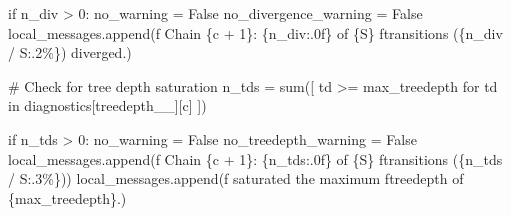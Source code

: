 \documentclass[
  letterpaper,
  DIV=11,
  numbers=noendperiod]{scrartcl}
\newenvironment{Shaded}{\begin{snugshade}}{\end{snugshade}}
\newcommand{\BuiltInTok}[1]{\textcolor[rgb]{0.00,0.23,0.31}{#1}}
\newcommand{\CommentTok}[1]{\textcolor[rgb]{0.37,0.37,0.37}{#1}}
\newcommand{\ControlFlowTok}[1]{\textcolor[rgb]{0.00,0.23,0.31}{#1}}
\newcommand{\DecValTok}[1]{\textcolor[rgb]{0.68,0.00,0.00}{#1}}
\newcommand{\KeywordTok}[1]{\textcolor[rgb]{0.00,0.23,0.31}{#1}}
\newcommand{\NormalTok}[1]{\textcolor[rgb]{0.00,0.23,0.31}{#1}}
\newcommand{\OperatorTok}[1]{\textcolor[rgb]{0.37,0.37,0.37}{#1}}
\newcommand{\SpecialCharTok}[1]{\textcolor[rgb]{0.37,0.37,0.37}{#1}}
\newcommand{\SpecialStringTok}[1]{\textcolor[rgb]{0.13,0.47,0.30}{#1}}
\newcommand{\StringTok}[1]{\textcolor[rgb]{0.13,0.47,0.30}{#1}}
\newcommand{\VariableTok}[1]{\textcolor[rgb]{0.07,0.07,0.07}{#1}}
\begin{document}
\begin{Shaded}
\begin{Highlighting}[]
    \ControlFlowTok{if}\NormalTok{ n\_div }\OperatorTok{\textgreater{}} \DecValTok{0}\NormalTok{:}
\NormalTok{      no\_warning }\OperatorTok{=} \VariableTok{False}
\NormalTok{      no\_divergence\_warning }\OperatorTok{=} \VariableTok{False}
\NormalTok{      local\_messages.append(}\SpecialStringTok{f\textquotesingle{}  Chain }\SpecialCharTok{\{}\NormalTok{c }\OperatorTok{+} \DecValTok{1}\SpecialCharTok{\}}\SpecialStringTok{: }\SpecialCharTok{\{}\NormalTok{n\_div}\SpecialCharTok{:.0f\}}\SpecialStringTok{ of }\SpecialCharTok{\{}\NormalTok{S}\SpecialCharTok{\}}\SpecialStringTok{ \textquotesingle{}}
                            \SpecialStringTok{f\textquotesingle{}transitions (}\SpecialCharTok{\{}\NormalTok{n\_div }\OperatorTok{/}\NormalTok{ S}\SpecialCharTok{:.2\%\}}\SpecialStringTok{) diverged.\textquotesingle{}}\NormalTok{)}
    
    \CommentTok{\# Check for tree depth saturation}
\NormalTok{    n\_tds }\OperatorTok{=} \BuiltInTok{sum}\NormalTok{([ td }\OperatorTok{\textgreater{}=}\NormalTok{ max\_treedepth }
                  \ControlFlowTok{for}\NormalTok{ td }\KeywordTok{in}\NormalTok{ diagnostics[}\StringTok{\textquotesingle{}treedepth\_\_\textquotesingle{}}\NormalTok{][c] ])}
    
    \ControlFlowTok{if}\NormalTok{ n\_tds }\OperatorTok{\textgreater{}} \DecValTok{0}\NormalTok{:}
\NormalTok{      no\_warning }\OperatorTok{=} \VariableTok{False}
\NormalTok{      no\_treedepth\_warning }\OperatorTok{=} \VariableTok{False}
\NormalTok{      local\_messages.append(}\SpecialStringTok{f\textquotesingle{}  Chain }\SpecialCharTok{\{}\NormalTok{c }\OperatorTok{+} \DecValTok{1}\SpecialCharTok{\}}\SpecialStringTok{: }\SpecialCharTok{\{}\NormalTok{n\_tds}\SpecialCharTok{:.0f\}}\SpecialStringTok{ of }\SpecialCharTok{\{}\NormalTok{S}\SpecialCharTok{\}}\SpecialStringTok{ \textquotesingle{}}
                            \SpecialStringTok{f\textquotesingle{}transitions (}\SpecialCharTok{\{}\NormalTok{n\_tds }\OperatorTok{/}\NormalTok{ S}\SpecialCharTok{:.3\%\}}\SpecialStringTok{)\textquotesingle{}}\NormalTok{)}
\NormalTok{      local\_messages.append(}\SpecialStringTok{f\textquotesingle{}           saturated the maximum \textquotesingle{}}
                            \SpecialStringTok{f\textquotesingle{}treedepth of }\SpecialCharTok{\{}\NormalTok{max\_treedepth}\SpecialCharTok{\}}\SpecialStringTok{.\textquotesingle{}}\NormalTok{)}
    

\end{Highlighting}
\end{Shaded}
\end{document}
